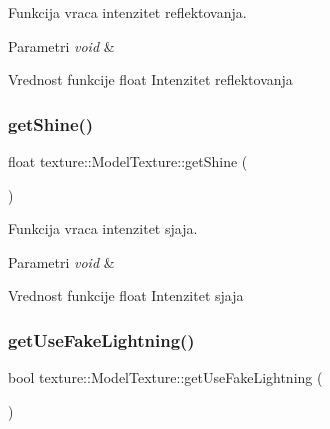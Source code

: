 Funkcija vraca intenzitet reflektovanja. 


\begin{DoxyParams}{Parametri}
{\em void} & \\
\hline
\end{DoxyParams}
\begin{DoxyReturn}{Vrednost funkcije}
float Intenzitet reflektovanja 
\end{DoxyReturn}
\mbox{\label{classtexture_1_1ModelTexture_a2336ba8c1ccc1eea9419fb2cd3773888}} 
\subsubsection{\texorpdfstring{get\+Shine()}{getShine()}}
{\footnotesize\ttfamily float texture\+::\+Model\+Texture\+::get\+Shine (\begin{DoxyParamCaption}{ }\end{DoxyParamCaption})}



Funkcija vraca intenzitet sjaja. 


\begin{DoxyParams}{Parametri}
{\em void} & \\
\hline
\end{DoxyParams}
\begin{DoxyReturn}{Vrednost funkcije}
float Intenzitet sjaja 
\end{DoxyReturn}
\mbox{\label{classtexture_1_1ModelTexture_adc202fd47232d085312fea26bc17d69e}} 
\subsubsection{\texorpdfstring{get\+Use\+Fake\+Lightning()}{getUseFakeLightning()}}
{\footnotesize\ttfamily bool texture\+::\+Model\+Texture\+::get\+Use\+Fake\+Lightning (\begin{DoxyParamCaption}{ }\end{DoxyParamCaption})}



